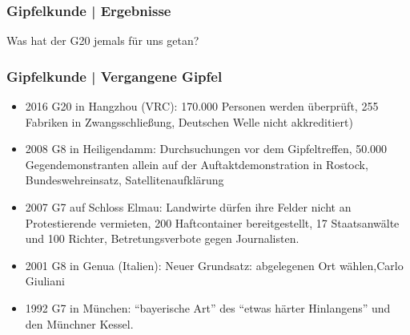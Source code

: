 \documentclass[]{beamer}
\begin{document}
	\begin{frame}
	\frametitle{Gipfelkunde | Ergebnisse}
	Was hat der G20 jemals für uns getan?
	\end{frame}

	\begin{frame}
		\frametitle{Gipfelkunde | Vergangene Gipfel}
		\begin{itemize}
			\item 2016 G20 in Hangzhou (VRC): 170.000 Personen werden überprüft, 255 Fabriken in Zwangsschließung, Deutschen Welle nicht akkreditiert)
			\item 2008 G8 in Heiligendamm: Durchsuchungen vor dem Gipfeltreffen, 50.000 Gegendemonstranten allein auf der Auftaktdemonstration in Rostock, Bundeswehreinsatz, Satellitenaufklärung
			\item 2007 G7 auf Schloss Elmau: Landwirte dürfen ihre Felder nicht an Protestierende vermieten, 200 Haftcontainer bereitgestellt, 17 Staatsanwälte und 100 Richter, Betretungsverbote gegen Journalisten.
			\item 2001 G8 in Genua (Italien): Neuer Grundsatz: abgelegenen Ort wählen,Carlo Giuliani
			\item 1992 G7 in München: \enquote{bayerische Art} des \enquote{etwas härter Hinlangens} und den Münchner Kessel. 
		\end{itemize}
\end{frame}
\end{document}
